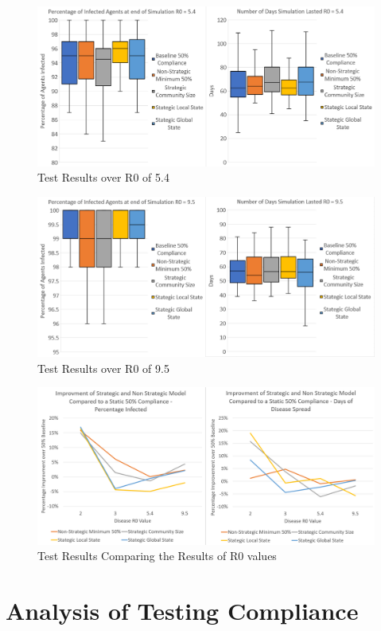 \documentclass{article}
\begin{document}
\begin{figure}[h!]
  \centering
      \includegraphics[width=\textwidth]{3}
  \caption{Test Results over R0 of 5.4}
\end{figure}
\newpage
\begin{figure}[h!]
  \centering
      \includegraphics[width=\textwidth]{2}
  \caption{Test Results over R0 of 9.5}
\end{figure}

\begin{figure}[h!]
  \centering
      \includegraphics[width=\textwidth]{1}
  \caption{Test Results Comparing the Results of R0 values}
\end{figure}
\newpage

\section{Analysis of Testing Compliance}
\end{document}

